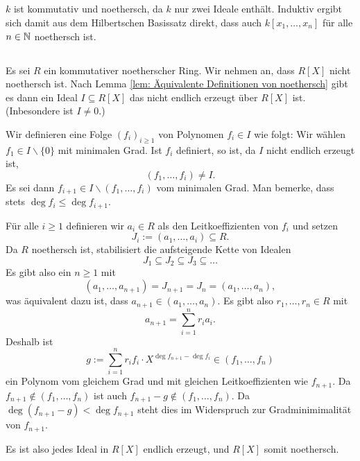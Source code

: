 \documentclass[a4paper,10pt]{article}
\begin{document}
\subsection{}
$k$ ist kommutativ und noethersch, da $k$ nur zwei Ideale enthält. Induktiv ergibt sich damit aus dem Hilbertschen Basissatz direkt, dass auch $k[x_1, \ldots, x_n]$ für alle $n \in \mathbb{N}$ noethersch ist.


\subsection{}
Es sei $R$ ein kommutativer noetherscher Ring. Wir nehmen an, dass $R[X]$ nicht noethersch ist. Nach Lemma \ref{lem: Äquivalente Definitionen von noethersch} gibt es dann ein Ideal $I \subseteq R[X]$ das nicht endlich erzeugt über $R[X]$ ist. (Inbesondere ist $I \neq 0$.)

Wir definieren eine Folge $(f_i)_{i \geq 1}$ von Polynomen $f_i \in I$ wie folgt: Wir wählen $f_1 \in I \smallsetminus \{0\}$ mit minimalen Grad. Ist $f_i$ definiert, so ist, da $I$ nicht endlich erzeugt ist,
\[
 (f_1, \ldots, f_i) \neq I.
\]
Es sei dann $f_{i+1} \in I \smallsetminus (f_1, \ldots, f_i)$ vom minimalen Grad. Man bemerke, dass stets $\deg f_i \leq \deg f_{i+1}$.

Für alle $i \geq 1$ definieren wir $a_i \in R$ als den Leitkoeffizienten von $f_i$ und setzen
\[
 J_i := (a_1, \ldots, a_i) \subseteq R.
\]
Da $R$ noethersch ist, stabilisiert die aufsteigende Kette von Idealen
\[
 J_1 \subseteq J_2 \subseteq J_3 \subseteq \ldots
\]
Es gibt also ein $n \geq 1$ mit
\[
 (a_1, \ldots, a_{n+1}) = J_{n+1} = J_n = (a_1, \ldots, a_n),
\]
was äquivalent dazu ist, dass $a_{n+1} \in (a_1, \ldots, a_n)$. Es gibt also $r_1, \ldots, r_n \in R$ mit
\[
 a_{n+1} = \sum_{i=1}^n r_i a_i.
\]
Deshalb ist
\[
 g := \sum_{i=1}^n r_i f_i \cdot X^{\deg f_{n+1} - \deg f_i} \in (f_1, \ldots, f_n)
\]
ein Polynom vom gleichem Grad und mit gleichen Leitkoeffizienten wie $f_{n+1}$. Da $f_{n+1} \not\in (f_1, \ldots, f_n)$ ist auch $f_{n+1}-g \not\in (f_1, \ldots, f_n)$. Da $\deg (f_{n+1}-g) < \deg f_{n+1}$ steht dies im Widerspruch zur Gradminimimalität von $f_{n+1}$.

Es ist also jedes Ideal in $R[X]$ endlich erzeugt, und $R[X]$ somit noethersch.






\section{}
\end{document}
